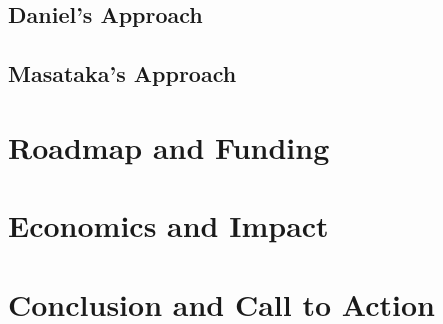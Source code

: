 \documentclass[10pt]{article}
\begin{document}
\begin{sloppypar}

  \subsection{Daniel's Approach}
  \label{sec:daniel-approach}

  \subsection{Masataka's Approach}
  \label{sec:masataka-approach}



  \section{Roadmap and Funding}
  \label{sec:next-years}

  \section{Economics and Impact}
  \label{sec:economics}

  \section{Conclusion and Call to Action}
  \label{sec:conclusion}


  \pagebreak
  
  
  \nocite{*}

\end{sloppypar}
\end{document}
